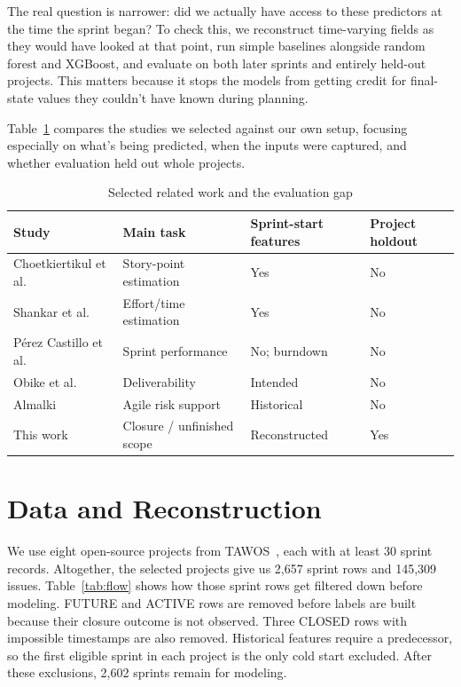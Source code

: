 \documentclass[conference]{IEEEtran}
\begin{document}
The real question is narrower: did we actually have access to these predictors at the time the sprint began? To check this, we reconstruct time-varying fields as they would have looked at that point, run simple baselines alongside random forest and XGBoost, and evaluate on both later sprints and entirely held-out projects. This matters because it stops the models from getting credit for final-state values they couldn't have known during planning.

Table~\ref{tab:related} compares the studies we selected against our own setup, focusing especially on what's being predicted, when the inputs were captured, and whether evaluation held out whole projects.

\begin{table}[!htb]
\centering\scriptsize
\caption{Selected related work and the evaluation gap}
\label{tab:related}
\setlength{\tabcolsep}{2.2pt}
\begin{tabular}{@{}p{1.55cm}p{1.55cm}p{1.05cm}p{1.1cm}@{}}
\toprule
Study & Main task & Sprint-start features & Project holdout\\
\midrule
Choetkiertikul et al. & Story-point estimation & Yes & No\\
Shankar et al. & Effort/time estimation & Yes & No\\
P\'erez Castillo et al. & Sprint performance & No; burndown & No\\
Obike et al. & Deliverability & Intended & No\\
Almalki & Agile risk support & Historical & No\\
This work & Closure / unfinished scope & Reconstructed & Yes\\
\bottomrule
\end{tabular}
\end{table}

\section{Data and Reconstruction}
We use eight open-source projects from TAWOS~\cite{tawosi2022}, each with at least 30 sprint records. Altogether, the selected projects give us 2,657 sprint rows and 145,309 issues. Table~\ref{tab:flow} shows how those sprint rows get filtered down before modeling. FUTURE and ACTIVE rows are removed before labels are built because their closure outcome is not observed. Three CLOSED rows with impossible timestamps are also removed. Historical features require a predecessor, so the first eligible sprint in each project is the only cold start excluded. After these exclusions, 2,602 sprints remain for modeling.
\end{document}
